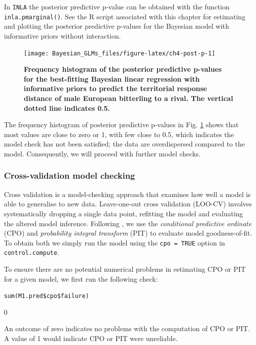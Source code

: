 \documentclass[
]{book}
\begin{document}
In \texttt{INLA} the posterior predictive p-value can be obtained with the function \texttt{inla.pmarginal()}. See the R script associated with this chapter for estimating and plotting the posterior predictive p-values for the Bayesian model with informative priors without interaction.



\begin{figure}

{\centering \texttt{[image: Bayesian\_GLMs\_files/figure-latex/ch4-post-p-1]} 

}

\caption{\textbf{Frequency histogram of the posterior predictive p-values for the best-fitting Bayesian linear regression with informative priors to predict the territorial response distance of male European bitterling to a rival. The vertical dotted line indicates 0.5.}}\label{fig:ch4-post-p}
\end{figure}

The frequency histogram of posterior predictive p-values in Fig. \ref{fig:ch4-post-p} shows that most values are close to zero or 1, with few close to 0.5, which indicates the model check has not been satisfied; the data are overdispersed compared to the model. Consequently, we will proceed with further model checks.

\hypertarget{cross-validation-model-checking}{%
\subsubsection{Cross-validation model checking}\label{cross-validation-model-checking}}

Cross validation is a model-checking approach that examines how well a model is able to generalise to new data. Leave-one-out cross validation (LOO-CV) involves systematically dropping a single data point, refitting the model and evaluating the altered model inference. Following \citep{Wang_2018}, we use the \emph{conditional predictive ordinate} (CPO) and \emph{probability integral transform} (PIT) to evaluate model goodness-of-fit. To obtain both we simply run the model using the \texttt{cpo\ =\ TRUE} option in \texttt{control.compute}.

To ensure there are no potential numerical problems in estimating CPO or PIT for a given model, we first run the following check:

\texttt{sum(M1.pred\$cpo\$failure)}

0

An outcome of zero indicates no problems with the computation of CPO or PIT. A value of 1 would indicate CPO or PIT were unreliable.
\end{document}
